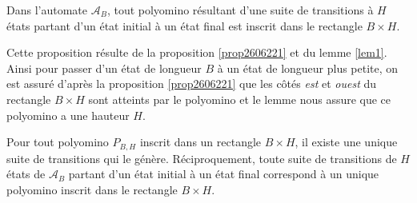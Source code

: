 \begin{Prop}\label{inscr1}
Dans l’automate $ \mathcal{A}_{B}$, tout polyomino résultant d’une suite de transitions à $H$ états partant d’un état initial à un état final est inscrit dans le rectangle $B\times H$.
\end{Prop}
\begin{Pre}
Cette proposition résulte de la proposition \ref{prop2606221} et du lemme \ref{lem1}. Ainsi pour passer d’un état  de longueur $B$ à un état de longueur plus petite, on est assuré d’après la  proposition \ref{prop2606221} que les côtés \emph{est}  et \emph{ouest} du rectangle $B\times H $ sont atteints par le polyomino et le lemme nous assure que ce polyomino a une hauteur $H$. 
\end{Pre}
\begin{Prop}\label{propj1}
Pour tout polyomino $P_{B,H}$  inscrit dans un rectangle $B\times H$, il existe une  unique suite de transitions qui le génère. Réciproquement, toute suite de transitions de $H$ états de $\mathcal{A}_{B}$ partant d'un état initial à un état final correspond à un unique polyomino inscrit dans le rectangle $ B\times H$.
\end{Prop}
